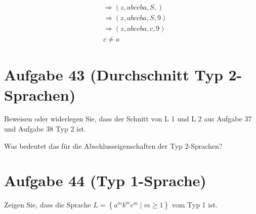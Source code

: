 \documentclass{article}
\begin{document}
\begin{equation}
\begin{split}
&\Rightarrow(z, abccba, S, ) \\\ 
&\Rightarrow(z, abccba, S, 9) \\\ 
&\Rightarrow(z, abccba, c, 9) \\\ 
&c \neq a
\end{split}
\end{equation}


\section*{Aufgabe 43 (Durchschnitt Typ 2-Sprachen)}

Beweisen oder widerlegen Sie, dass der Schnitt von L 1 und L 2 aus Aufgabe 37 und Aufgabe 38 Typ 2 ist.


Was bedeutet das für die Abschlusseigenschaften der Typ 2-Sprachen?


\section*{Aufgabe 44 (Typ 1-Sprache)}

Zeigen Sie, dass die Sprache $L = \left\{a^m b^m c^m \mid m \geq 1\right\}$ vom Typ 1 ist.
\end{document}
